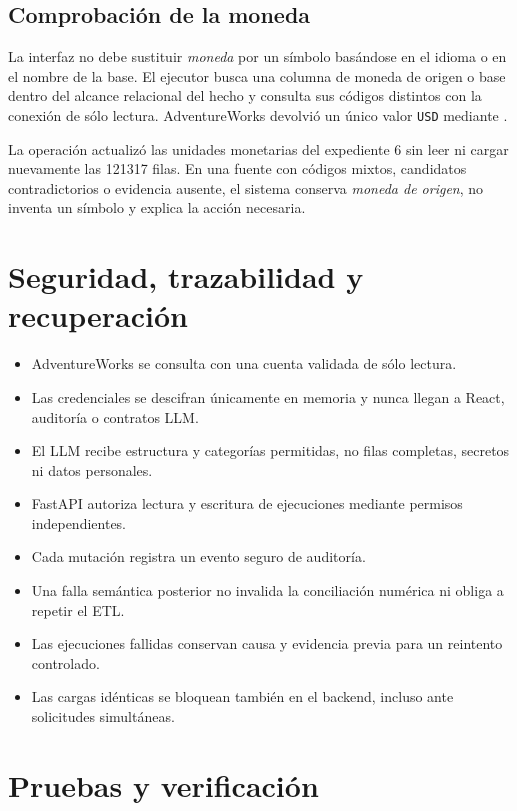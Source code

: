 \documentclass[11pt,letterpaper]{article}
\newcommand{\file}[1]{\texttt{#1}}
\begin{document}
\subsection{Comprobación de la moneda}

La interfaz no debe sustituir \textit{moneda} por un símbolo basándose en el idioma o en el nombre de la base. El ejecutor busca una columna de moneda de origen o base dentro del alcance relacional del hecho y consulta sus códigos distintos con la conexión de sólo lectura. AdventureWorks devolvió un único valor \file{USD} mediante .

La operación actualizó las unidades monetarias del expediente 6 sin leer ni cargar nuevamente las 121317 filas. En una fuente con códigos mixtos, candidatos contradictorios o evidencia ausente, el sistema conserva \textit{moneda de origen}, no inventa un símbolo y explica la acción necesaria.

\section{Seguridad, trazabilidad y recuperación}

\begin{itemize}
  \item AdventureWorks se consulta con una cuenta validada de sólo lectura.
  \item Las credenciales se descifran únicamente en memoria y nunca llegan a React, auditoría o contratos LLM.
  \item El LLM recibe estructura y categorías permitidas, no filas completas, secretos ni datos personales.
  \item FastAPI autoriza lectura y escritura de ejecuciones mediante permisos independientes.
  \item Cada mutación registra un evento seguro de auditoría.
  \item Una falla semántica posterior no invalida la conciliación numérica ni obliga a repetir el ETL.
  \item Las ejecuciones fallidas conservan causa y evidencia previa para un reintento controlado.
  \item Las cargas idénticas se bloquean también en el backend, incluso ante solicitudes simultáneas.
\end{itemize}

\section{Pruebas y verificación}
\end{document}
